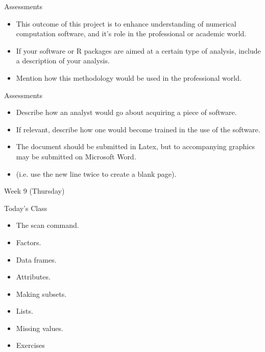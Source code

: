 \documentclass[pdf,default,slideColor,colorBG]{prosper}
\begin{document}
\begin{slide}{Assessments}
\begin{itemize}
\item This outcome of this project is to enhance understanding of numerical computation software, and it's
role in the professional or academic world.

\item If your software or R packages are aimed at a certain type of analysis, include a description of your analysis. \item Mention how this methodology would be used in
the professional world.
\end{itemize}
\end{slide}
\begin{slide}{Assessments}
\begin{itemize}

\item Describe how an analyst would go about acquiring a piece of software.

\item If relevant, describe how one would become trained in the use of the software.
\item The document should be submitted in Latex, but to accompanying graphics may be submitted on Microsoft Word.
\item (i.e. use the new line twice to create a blank page).
\end{itemize}
\end{slide}
\begin{slide}{Week 9 (Thursday)}

Today's Class

\begin{itemize}
    \item The scan command.
    \item Factors.
    \item Data frames.
    \item Attributes.
    \item Making subsets.
    \item Lists.
    \item Missing values.
    \item Exercises
\end{itemize}
\end{slide}
\end{document}
